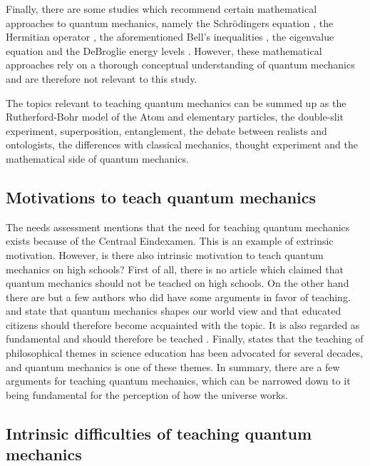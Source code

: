 \documentclass[11pt,twoside]{report} %
\begin{document}
Finally, there are some studies which recommend certain mathematical approaches to quantum mechanics, namely the Schrödingers equation \cite{muller, singh2}, the Hermitian operator \cite{singh2}, the aforementioned Bell's inequalities \cite{kuttner, muller}, the eigenvalue equation \cite{muller} and the DeBroglie energy levels \cite{dori, gianino, mckagan}. However, these mathematical approaches rely on a thorough conceptual understanding of quantum mechanics and are therefore not relevant to this study.

The topics relevant to teaching quantum mechanics can be summed up as the Rutherford-Bohr model of the Atom and elementary particles, the double-slit experiment, superposition, entanglement, the debate between realists and ontologists, the differences with classical mechanics, thought experiment and the mathematical side of quantum mechanics.

\subsection{Motivations to teach quantum mechanics}

The needs assessment mentions that the need for teaching quantum mechanics exists because of the Centraal Eindexamen. This is an example of extrinsic motivation. However, is there also intrinsic motivation to teach quantum mechanics on high schools? First of all, there is no article which claimed that quantum mechanics should not be teached on high schools. On the other hand there are but a few authors who did have some arguments in favor of teaching.  and  state that quantum mechanics shapes our world view and that educated citizens should therefore become acquainted with the topic. It is also regarded as fundamental and should therefore be teached \cite{henriksen,hobson}. Finally,  states that the teaching of philosophical themes in science education has been advocated for several decades, and quantum mechanics is one of these themes. In summary, there are a few arguments for teaching quantum mechanics, which can be narrowed down to it being fundamental for the perception of how the universe works.

\subsection{Intrinsic difficulties of teaching quantum mechanics}
\end{document}
